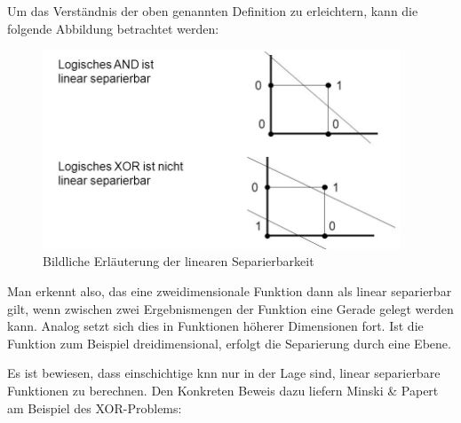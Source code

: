 Um das Verständnis der oben genannten Definition zu erleichtern, kann die folgende Abbildung betrachtet werden:

\begin{figure}[H]
\centering
		\includegraphics[width=0.95\textwidth]{Linear_Sep.png}
	\caption{Bildliche Erläuterung der linearen Separierbarkeit}
	\label{fig:Bildliche Erläuterung der linearen Separierbarkeit}
\end{figure}

Man erkennt also, das eine zweidimensionale Funktion dann als linear separierbar gilt, wenn zwischen zwei Ergebnismengen der Funktion eine Gerade gelegt werden kann. Analog setzt sich dies in Funktionen höherer Dimensionen fort. Ist die Funktion zum Beispiel dreidimensional, erfolgt die Separierung durch eine Ebene.

Es ist bewiesen, dass einschichtige \acs{knn} nur in der Lage sind, linear separierbare Funktionen zu berechnen. Den Konkreten Beweis dazu liefern Minski \& Papert am Beispiel des XOR-Problems:

